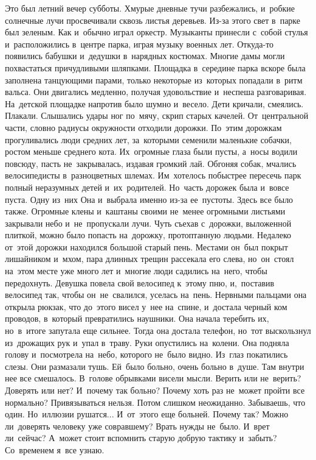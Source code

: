 Это был летний вечер субботы.
Хмурые дневные тучи разбежались, и~робкие солнечные лучи просвечивали сквозь листья деревьев.
Из-за этого свет в~парке был зеленым.
Как и~обычно играл оркестр.
Музыканты принесли с~собой стулья и~расположились в~центре парка, играя музыку военных лет.
Откуда-то появились бабушки и~дедушки в~нарядных костюмах.
Многие дамы могли похвастаться причудливыми шляпками.
Площадка в~середине парка вскоре была заполнена танцующими парами, только некоторые из~которых попадали в~ритм вальса.
Они двигались медленно, получая удовольствие и~неспеша разговаривая.
На~детской площадке напротив было шумно и~весело.
Дети кричали, смеялись.
Плакали.
Слышались удары ног по~мячу, скрип старых качелей.
От~центральной части, словно радиусы окружности отходили дорожки.
По~этим дорожкам прогуливались люди средних лет, за~которыми семенили маленькие собачки, ростом меньше среднего кота.
Их~огромные глаза были пусты, а~носы водили повсюду, пасть не~закрывалась, издавая громкий лай.
Обгоняя собак, мчались велосипедисты в~разноцветных шлемах.
Им~хотелось побыстрее пересечь парк полный неразумных детей и~их~родителей.
Но~часть дорожек была и~вовсе пуста.
Одну из~них Она и~выбрала именно из-за ее~пустоты.
Здесь все было также.
Огромные клены и~каштаны своими не~менее огромными листьями закрывали небо и~не~пропускали лучи.
Чуть съехав с~дорожки, выложенной плиткой, можно было попасть на~дорожку, протоптанную людьми.
Недалеко от~этой дорожки находился большой старый пень.
Местами он~был покрыт лишайником и~мхом, пара длинных трещин рассекала его слева, но~он~стоял на~этом месте уже много лет и~многие люди садились на~него, чтобы передохнуть.
Девушка повела свой велосипед к~этому пню, и,~поставив велосипед так, чтобы он~не~свалился, уселась на~пень.
Нервными пальцами она открыла рюкзак, что до~этого висел у~нее на~спине, и~достала черный ком проводов, в~который превратились наушники.
Она начала теребить их, но~в~итоге запутала еще сильнее.
Тогда она достала телефон, но~тот выскользнул из~дрожащих рук и~упал в~траву.
Руки опустились на~колени.
Она подняла голову и~посмотрела на~небо, которого не~было видно.
Из~глаз покатились слезы.
Они размазали тушь.
Ей~было больно, очень больно в~душе.
Там внутри нее все смешалось.
В~голове обрывками висели мысли.
Верить или не~верить? Доверять или нет? И~почему так больно? Почему хоть раз не~может пройти все нормально? Привязываться нельзя.
Потом слишком неожиданно.
Забываешь, что один.
Но~иллюзии рушатся...
И~от~этого еще больней.
Почему так? Можно ли~доверять человеку уже совравшему? Врать нужды не~было.
И~врет ли~сейчас? А~может стоит вспомнить старую добрую тактику и~забыть? Со~временем я~все узнаю.
